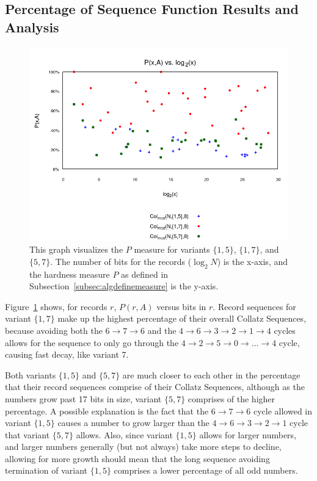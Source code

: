 \subsection{Percentage of Sequence Function Results and Analysis} \label{subsubsec:algmulpercentage}
\begin{figure}
    \centering
    \includegraphics[scale=0.6]{ModAvoidanceAnalysisPics/P_vs_log_multi_base.png}
    \caption{This graph visualizes the $P$ measure for variants $\{1,5\}$, $\{1,7\}$, and $\{5,7\}$. The number of bits for the records ($\log_2{N}$) is the x-axis, and the hardness measure $P$ as defined in Subsection~\ref{subsec:algdefinemeasure} is the y-axis.}
    \label{fig:p_multi_vslog}
\end{figure}
Figure~\ref{fig:p_multi_vslog} shows, for records $r$, $P(r,A)$ versus bits in $r$. Record sequences for variant $\{1,7\}$ make up the highest percentage of their overall Collatz Sequences, because avoiding both the $6 \rightarrow 7 \rightarrow 6$ and the $4 \rightarrow 6 \rightarrow 3 \rightarrow 2 \rightarrow 1 \rightarrow 4$ cycles allows for the sequence to only go through the $4  \rightarrow 2 \rightarrow 5 \rightarrow 0 \rightarrow \ldots \rightarrow 4$ cycle, causing fast decay, like variant 7. \par
Both variants $\{1,5\}$ and $\{5,7\}$ are much closer to each other in the percentage that their record sequences comprise of their Collatz Sequences, although as the numbers grow past 17 bits in size, variant $\{5,7\}$ comprises of the higher percentage. A possible explanation is the fact that the $6 \rightarrow 7 \rightarrow 6$ cycle allowed in variant $\{1,5\}$ causes a number to grow larger than the $4 \rightarrow 6 \rightarrow 3 \rightarrow 2 \rightarrow 1$ cycle that variant $\{5,7\}$ allows. Also, since variant $\{1,5\}$ allows for larger numbers, and larger numbers generally (but not always) take more steps to decline, allowing for more growth should mean that the long sequence avoiding termination of variant $\{1,5\}$ comprises a lower percentage of all odd numbers.
